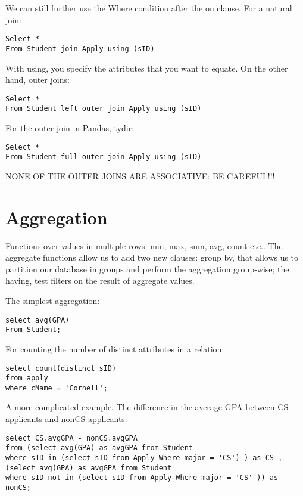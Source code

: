 \documentclass[11pt, oneside]{article}   	%
\begin{document}
We can still further use the Where condition after the on clause. For a natural join:

\begin{lstlisting}
Select *
From Student join Apply using (sID)
\end{lstlisting}

With using, you specify the attributes that you want to equate. On the other hand, outer joins:

\begin{lstlisting}
Select *
From Student left outer join Apply using (sID)
\end{lstlisting}

For the outer join in Pandas, tydir:

\begin{lstlisting}
Select *
From Student full outer join Apply using (sID)
\end{lstlisting}

NONE OF THE OUTER JOINS ARE ASSOCIATIVE: BE CAREFUL!!!

\section{Aggregation}

Functions over values in multiple rows: min, max, sum, avg, count etc.. The aggregate functions allow us to add two new clauses: group by, that allows us to partition our database in groups and perform the aggregation group-wise; the having, test filters on the result of aggregate values. 

The simplest aggregation:

\begin{lstlisting}
select avg(GPA)
From Student;
\end{lstlisting}

For counting the number of distinct attributes in a relation:

\begin{lstlisting}
select count(distinct sID)
from apply
where cName = 'Cornell';
\end{lstlisting}

A more complicated example. The difference in the average GPA between CS applicants and nonCS applicants:

\begin{lstlisting}
select CS.avgGPA - nonCS.avgGPA 
from (select avg(GPA) as avgGPA from Student
where sID in (select sID from Apply Where major = 'CS') ) as CS ,
(select avg(GPA) as avgGPA from Student
where sID not in (select sID from Apply Where major = 'CS' )) as nonCS;
\end{lstlisting}
\end{document}
